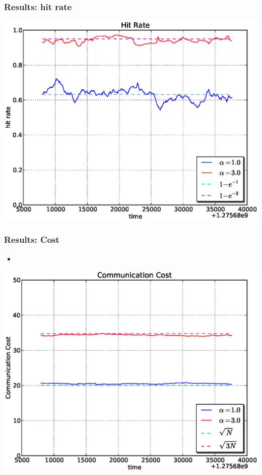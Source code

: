\documentclass[red]{beamer}
\begin{document}
\begin{frame}
\frametitle{Results: hit rate}
\begin{center}
\includegraphics[scale=0.4]{figs/plab_hit.eps}
\end{center}
\end{frame}

\begin{frame}
\frametitle{Results: Cost}
\begin{itemize}
\item 
\end{itemize}
\begin{center}
\includegraphics[scale=0.4]{figs/plab_cost.eps}
\end{center}
\end{frame}
\end{document}
